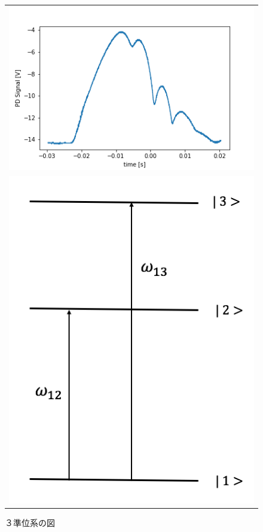 \documentclass[uplatex, dvipdfmx, a4paper, report, papersize, 11pt]{jsbook}
\begin{document}
\begin{figure}[H]
\begin{tabular}{c}
      \begin{minipage}{1\hsize}
        \centering
          \includegraphics[keepaspectratio,  scale=0.5, angle=0]
                          {figures/chapter2/PD_Signal_main.png}
                          \caption{飽和吸収分光によって観測されたCsの超微細構造}
                          \label{PD_Signal_main}
      \end{minipage} \\
      \begin{minipage}{0.50\hsize}
        \centering
          \includegraphics[keepaspectratio,  scale=0.3,  angle=0]
                          {figures/chapter2/crossover-diagram.png}
                          \caption{３準位系の図}
                          \label{crossover-diagram}
      \end{minipage}
    \end{tabular}
\end{figure}
\end{document}
